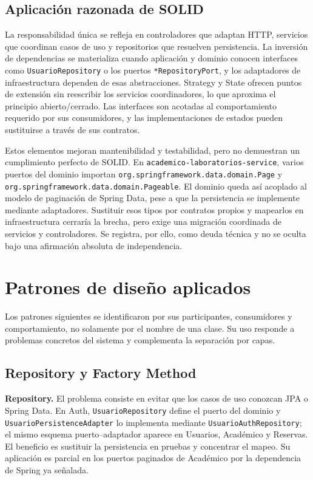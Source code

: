 \subsection{Aplicación razonada de SOLID}

La responsabilidad única se refleja en controladores que adaptan HTTP,
servicios que coordinan casos de uso y repositorios que resuelven persistencia.
La inversión de dependencias se materializa cuando aplicación y dominio conocen
interfaces como \texttt{UsuarioRepository} o los puertos
\texttt{*RepositoryPort}, y los adaptadores de infraestructura dependen de esas
abstracciones. Strategy y State ofrecen puntos de extensión sin reescribir los
servicios coordinadores, lo que aproxima el principio abierto/cerrado. Las
interfaces son acotadas al comportamiento requerido por sus consumidores, y
las implementaciones de estados pueden sustituirse a través de sus contratos.

Estos elementos mejoran mantenibilidad y testabilidad, pero no demuestran un
cumplimiento perfecto de SOLID. En
\texttt{academico-laboratorios-service}, varios puertos del dominio importan
\texttt{org.springframework.data.domain.Page} y
\texttt{org.springframework.data.domain.Pageable}. El dominio queda así
acoplado al modelo de paginación de Spring Data, pese a que la persistencia se
implemente mediante adaptadores. Sustituir esos tipos por contratos propios y
mapearlos en infraestructura cerraría la brecha, pero exige una migración
coordinada de servicios y controladores. Se registra, por ello, como deuda
técnica y no se oculta bajo una afirmación absoluta de independencia.

\section{Patrones de diseño aplicados}
\label{sec:patrones-gof}

Los patrones siguientes se identificaron por sus participantes, consumidores y
comportamiento, no solamente por el nombre de una clase. Su uso responde a
problemas concretos del sistema y complementa la separación por capas.

\subsection{Repository y Factory Method}

\textbf{Repository.} El problema consiste en evitar que los casos de uso
conozcan JPA o Spring Data. En Auth, \texttt{UsuarioRepository} define el puerto
del dominio y \texttt{UsuarioPersistenceAdapter} lo implementa mediante
\texttt{UsuarioAuthRepository}; el mismo esquema puerto--adaptador aparece en
Usuarios, Académico y Reservas. El beneficio es sustituir la persistencia en
pruebas y concentrar el mapeo. Su aplicación es parcial en los puertos paginados
de Académico por la dependencia de Spring ya señalada.

